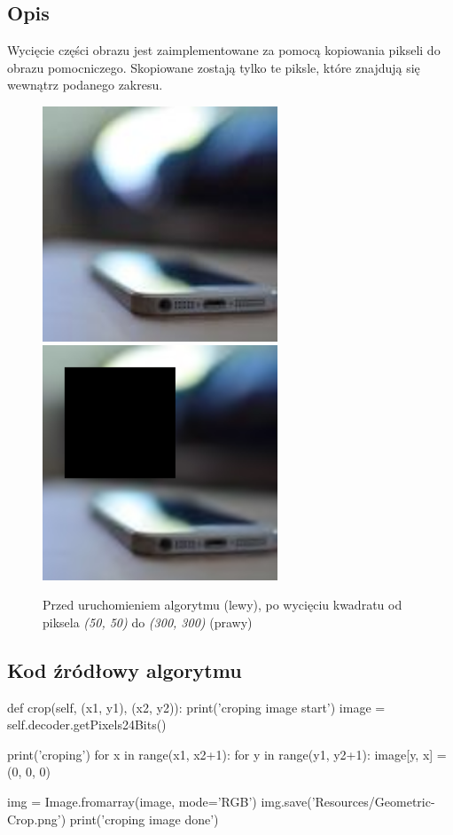 \documentclass[a4paper,12pt]{book}
\begin{document}
\subsection*{Opis}
Wycięcie części obrazu jest zaimplementowane za pomocą kopiowania pikseli do obrazu pomocniczego. Skopiowane zostają tylko te piksle, które znajdują się wewnątrz podanego zakresu. 
\begin{figure}[H]
	\caption{Przed uruchomieniem algorytmu (lewy), po wycięciu kwadratu od piksela \textit{(50, 50)} do \textit{(300, 300)} (prawy)}
	\includegraphics[width=7cm, height=7cm]{phone-unmodified.jpg}
	\includegraphics[width=7cm, height=7cm]{phone-crop.png}
\end{figure}
\subsection*{Kod źródłowy algorytmu}
\begin{python}
def crop(self, (x1, y1), (x2, y2)):
	print('croping image start')
	image = self.decoder.getPixels24Bits()
	
	print('croping')
	for x in range(x1, x2+1):
		for y in range(y1, y2+1):
			image[y, x] = (0, 0, 0)
	
	img = Image.fromarray(image, mode='RGB')
	img.save('Resources/Geometric-Crop.png')
	print('croping image done')
\end{python}
\end{document}
